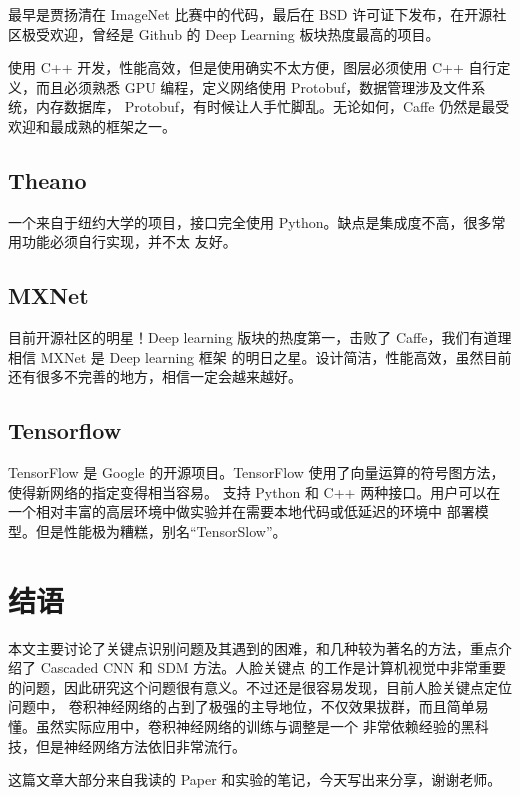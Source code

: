 \documentclass{ctexart}
\begin{document}
最早是贾扬清在 ImageNet 比赛中的代码，最后在 BSD 许可证下发布，在开源社区极受欢迎，曾经是 Github
的 Deep Learning 板块热度最高的项目。

使用 C++ 开发，性能高效，但是使用确实不太方便，图层必须使用
C++ 自行定义，而且必须熟悉 GPU 编程，定义网络使用 Protobuf，数据管理涉及文件系统，内存数据库，
Protobuf，有时候让人手忙脚乱。无论如何，Caffe 仍然是最受欢迎和最成熟的框架之一。

\subsection{Theano}

一个来自于纽约大学的项目，接口完全使用 Python。缺点是集成度不高，很多常用功能必须自行实现，并不太
友好。

\subsection{MXNet}

目前开源社区的明星！Deep learning 版块的热度第一，击败了 Caffe，我们有道理相信 MXNet 是 Deep learning 框架
的明日之星。设计简洁，性能高效，虽然目前还有很多不完善的地方，相信一定会越来越好。

\subsection{Tensorflow}
TensorFlow 是 Google 的开源项目。TensorFlow 使用了向量运算的符号图方法，使得新网络的指定变得相当容易。
支持 Python 和 C++ 两种接口。用户可以在一个相对丰富的高层环境中做实验并在需要本地代码或低延迟的环境中
部署模型。但是性能极为糟糕，别名“TensorSlow”。

\section{结语}

本文主要讨论了关键点识别问题及其遇到的困难，和几种较为著名的方法，重点介绍了 Cascaded CNN 和 SDM 方法。人脸关键点
的工作是计算机视觉中非常重要的问题，因此研究这个问题很有意义。不过还是很容易发现，目前人脸关键点定位问题中，
卷积神经网络的占到了极强的主导地位，不仅效果拔群，而且简单易懂。虽然实际应用中，卷积神经网络的训练与调整是一个
非常依赖经验的黑科技，但是神经网络方法依旧非常流行。

这篇文章大部分来自我读的 Paper 和实验的笔记，今天写出来分享，谢谢老师。

\pagebreak

\end{document}
